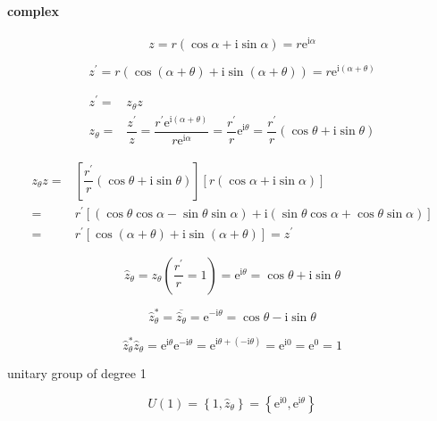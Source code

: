 \documentclass[
]{book}
\theoremstyle{definition}
\theoremstyle{definition}
\theoremstyle{definition}
\theoremstyle{definition}
\theoremstyle{remark}
\begin{document}
\paragraph{complex}\label{complex}

\[
z=r\left(\cos\alpha+\mathrm{i}\sin\alpha\right)=r\mathrm{e}^{\mathrm{i}\alpha}
\]

\[
z^{\prime}=r\left(\cos\left(\alpha+\theta\right)+\mathrm{i}\sin\left(\alpha+\theta\right)\right)=r\mathrm{e}^{\mathrm{i}\left(\alpha+\theta\right)}
\]

\[
\begin{aligned}
z^{\prime}= & z_{{\scriptscriptstyle \theta}}z\\
z_{{\scriptscriptstyle \theta}}= & \dfrac{z^{\prime}}{z}=\dfrac{r^{\prime}\mathrm{e}^{\mathrm{i}\left(\alpha+\theta\right)}}{r\mathrm{e}^{\mathrm{i}\alpha}}=\dfrac{r^{\prime}}{r}\mathrm{e}^{\mathrm{i}\theta}=\dfrac{r^{\prime}}{r}\left(\cos\theta+\mathrm{i}\sin\theta\right)
\end{aligned}
\]

\[
\begin{aligned}
z_{{\scriptscriptstyle \theta}}z= & \left[\dfrac{r^{\prime}}{r}\left(\cos\theta+\mathrm{i}\sin\theta\right)\right]\left[r\left(\cos\alpha+\mathrm{i}\sin\alpha\right)\right]\\
= & r^{\prime}\left[\left(\cos\theta\cos\alpha-\sin\theta\sin\alpha\right)+\mathrm{i}\left(\sin\theta\cos\alpha+\cos\theta\sin\alpha\right)\right]\\
= & r^{\prime}\left[\cos\left(\alpha+\theta\right)+\mathrm{i}\sin\left(\alpha+\theta\right)\right]=z^{\prime}
\end{aligned}
\]

\[
\hat{z}_{{\scriptscriptstyle \theta}}=z_{{\scriptscriptstyle \theta}}\left(\dfrac{r^{\prime}}{r}=1\right)=\mathrm{e}^{\mathrm{i}\theta}=\cos\theta+\mathrm{i}\sin\theta
\]

\[
\hat{z}_{{\scriptscriptstyle \theta}}^{*}=\overline{\hat{z}_{{\scriptscriptstyle \theta}}}=\mathrm{e}^{-\mathrm{i}\theta}=\cos\theta-\mathrm{i}\sin\theta
\]

\[
\hat{z}_{{\scriptscriptstyle \theta}}^{*}\hat{z}_{{\scriptscriptstyle \theta}}=\mathrm{e}^{\mathrm{i}\theta}\mathrm{e}^{-\mathrm{i}\theta}=\mathrm{e}^{\mathrm{i}\theta+\left(-\mathrm{i}\theta\right)}=\mathrm{e}^{\mathrm{i}0}=\mathrm{e}^{0}=1
\]

unitary group of degree 1

\[
U\left(1\right)=\left\{ 1,\hat{z}_{{\scriptscriptstyle \theta}}\right\} =\left\{ \mathrm{e}^{\mathrm{i}0},\mathrm{e}^{\mathrm{i}\theta}\right\} 
\]
\end{document}
